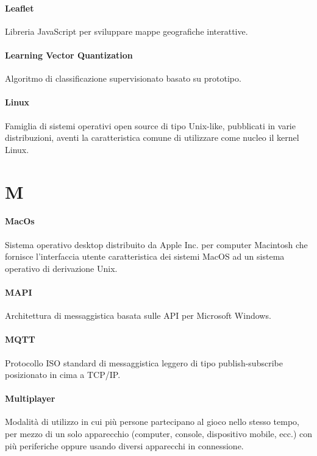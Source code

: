 \documentclass[]{article}
\begin{document}
	\paragraph*{Leaflet}
	Libreria JavaScript per sviluppare mappe geografiche interattive.
	
	\paragraph*{Learning Vector Quantization}
	Algoritmo di classificazione supervisionato basato su prototipo.
	
	\paragraph*{Linux}
	Famiglia di sistemi operativi open source di tipo Unix-like, pubblicati in varie distribuzioni, aventi la caratteristica comune di utilizzare come nucleo il kernel Linux.
	
	\newpage
	
	\section*{M}
	
	\paragraph*{MacOs}
	Sistema operativo desktop distribuito da Apple Inc. per	computer Macintosh che fornisce l'interfaccia utente caratteristica dei sistemi	MacOS ad un sistema operativo di derivazione Unix.
	
	\paragraph*{MAPI}
	Architettura di messaggistica basata sulle API per Microsoft Windows.
	
	\paragraph*{MQTT}
	Protocollo ISO standard di messaggistica leggero di tipo publish-subscribe posizionato in cima a TCP/IP. 
	
	\paragraph*{Multiplayer}
	Modalità di utilizzo in cui più persone partecipano al gioco nello stesso tempo, per mezzo di un solo apparecchio (computer, console, dispositivo mobile, ecc.) con più periferiche oppure usando diversi apparecchi in connessione.
	
\end{document}
